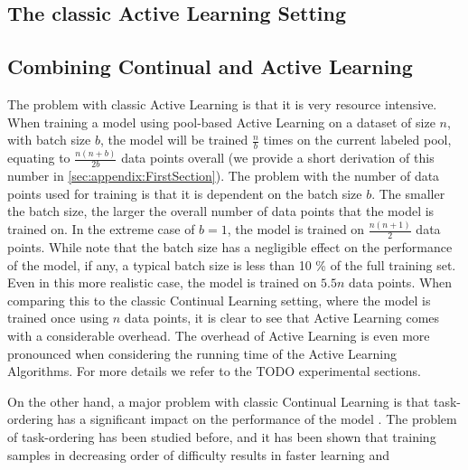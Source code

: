 \subsection{The classic Active Learning Setting}
\label{sec:Methodology:ALSetting}

\subsection{Combining Continual and Active Learning}
\label{sec:Methodology:CombiningCLandAL}
The problem with classic Active Learning is that it is very resource intensive. When training a model using pool-based Active Learning on a dataset of size $n$,
with batch size $b$, the model will be trained $\frac{n}{b}$ times on the current labeled pool, equating to $\frac{n(n+b)}{2b}$ data points overall (we provide a
short derivation of this number in \ref{sec:appendix:FirstSection}). The problem with the number of data points used for training is that it is dependent on the
batch size $b$. The smaller the batch size, the larger the overall number of data points that the model is trained on. In the extreme case of $b=1$, the model
is trained on $\frac{n(n+1)}{2}$ data points. While \cite{beck2021effective} note that the batch size has a negligible effect on the performance of the model,
if any, a typical batch size is less than 10 \% of the full training set. Even in this more realistic case, the model is trained on $5.5n$ data points. When
comparing this to the classic Continual Learning setting, where the model is trained once using $n$ data points, it is clear to see that Active Learning comes
with a considerable overhead. The overhead of Active Learning is even more pronounced when considering the running time of the Active Learning Algorithms.
For more details we refer to the TODO experimental sections. \par
On the other hand, a major problem with classic Continual Learning is that task-ordering has a significant impact on the performance of the model \cite{bell2022effect}.
The problem of task-ordering has been studied before, and it has been shown that training samples in decreasing order of difficulty results in faster learning and 
